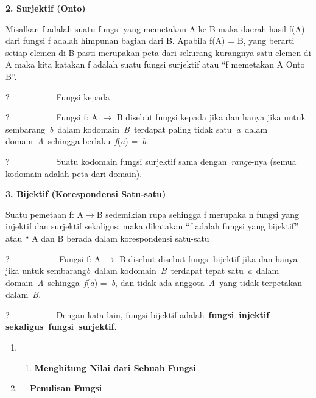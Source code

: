 \documentclass[11pt,fleqn]{book} %
\begin{document}
\begin{myEnumerate}
\begin{itemize}
\noindent \textbf{2.   Surjektif (Onto)}

\noindent Misalkan f adalah suatu fungsi yang memetakan A ke B maka daerah hasil f(A) dari fungsi f adalah himpunan bagian dari B. Apabila f(A) = B, yang berarti setiap elemen di B pasti merupakan peta dari sekurang-kurangnya satu elemen di A maka kita katakan f adalah suatu fungsi surjektif atau ``f memetakan A Onto B''.

\noindent ?~~~~~~~~~~~Fungsi kepada

\noindent ?~~~~~~~~~~~Fungsi f: A $\mathrm{\to}$ B disebut fungsi kepada jika dan hanya jika untuk sembarang~\textit{b}~dalam kodomain~\textit{B}~terdapat paling tidak satu~\textit{a}~dalam domain~\textit{A}~sehingga berlaku~\textit{f}(\textit{a}) =~\textit{b}.

\noindent ?~~~~~~~~~~~Suatu kodomain fungsi surjektif sama dengan~\textit{range}-nya (semua kodomain adalah peta dari domain).

\noindent 

\noindent \textbf{3. Bijektif (Korespondensi Satu-satu)}

\noindent 

\noindent Suatu pemetaan f: A$\mathrm{\to}$B sedemikian rupa sehingga f merupaka n fungsi yang injektif dan surjektif sekaligus, maka dikatakan ``f adalah fungsi yang bijektif'' atau `` A dan B berada dalam korespondensi satu-satu

\noindent 

\noindent ?~~~~~~~~~~~ Fungsi f: A $\mathrm{\to}$ B disebut disebut fungsi bijektif jika dan hanya jika untuk sembarang\textit{b}~dalam kodomain~\textit{B}~terdapat tepat satu~\textit{a}~dalam domain~\textit{A}~sehingga~\textit{f}(\textit{a}) =~\textit{b}, dan tidak ada anggota~\textit{A}~yang tidak terpetakan dalam~\textit{B}.

\noindent ?~~~~~~~~~~~Dengan kata lain, fungsi bijektif adalah~\textbf{fungsi~injektif sekaligus~fungsi~surjektif.}

\noindent \textbf{}

\noindent \textbf{}

\begin{enumerate}
\item \begin{enumerate}
\item \textbf{ Menghitung Nilai dari Sebuah Fungsi}
\end{enumerate}

\item \textbf{ ~~Penulisan Fungsi}
\end{enumerate}


\end{itemize}
\end{myEnumerate}
\end{document}
